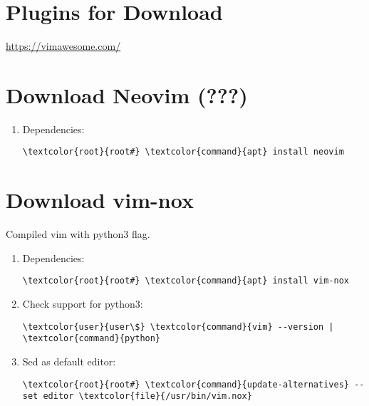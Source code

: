 \documentclass[10pt, a4paper, onecolumn, openany]{book} %
\begin{document}
\section{Plugins for Download}
\underline{\url{https://vimawesome.com/}}
\section{Download Neovim (???)}
\begin{enumerate}
    \item Dependencies:
\begin{Verbatim}[commandchars=\\\{\}]
\textcolor{root}{root#} \textcolor{command}{apt} install neovim
\end{Verbatim}  
\end{enumerate}
\section{Download vim-nox}
Compiled vim with python3 flag.
\begin{enumerate}
    \item Dependencies:
\begin{Verbatim}[commandchars=\\\{\}]
\textcolor{root}{root#} \textcolor{command}{apt} install vim-nox
\end{Verbatim}      
    \item Check support for python3:
\begin{Verbatim}[commandchars=\\\{\}]
\textcolor{user}{user\$} \textcolor{command}{vim} --version | \textcolor{command}{python}
\end{Verbatim}
    \item Sed as default editor:
\begin{Verbatim}[commandchars=\\\{\}]
\textcolor{root}{root#} \textcolor{command}{update-alternatives} --set editor \textcolor{file}{/usr/bin/vim.nox}
\end{Verbatim}
\end{enumerate}
\end{document}

